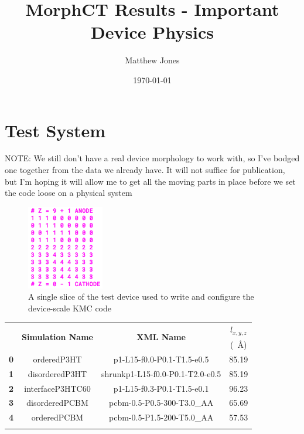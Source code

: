 \documentclass[12pt]{article}
\title{MorphCT Results - Important Device Physics}
\author{Matthew Jones}
\date{\today}
\def\ccg{\cellcolor{gray}}
\begin{document}
\maketitle


\section{Test System}

NOTE: We still don't have a real device morphology to work with, so I've bodged one together from the data we already have.
It will not suffice for publication, but I'm hoping it will allow me to get all the moving parts in place before we set the code loose on a physical system

\begin{figure}[h!]\centering
	\includegraphics[width=0.3\textwidth]{Figures/device.png}
    \caption{A single slice of the test device used to write and configure the device-scale KMC code}
	\label{fig:device}
\end{figure}

\begin{center}
\begin{tabular}{| c | c | c | c |}
\hline
\rule{0pt}{2.5ex} 
\multirow{2}{*}{\textbf{ID}}&\multirow{2}{*}{\textbf{Simulation Name}}&\multirow{2}{*}{\textbf{XML Name}}&\textbf{$l_{x,y,z}$}\\
                            &&&(\SI{}{\AA})\\
\hhline{|====|}
\rule{0pt}{2.5ex}\textbf{\ccg0}&\ccg orderedP3HT&\ccg p1-L15-f0.0-P0.1-T1.5-e0.5&\ccg 85.19\\
\textbf{1}&disorderedP3HT&shrunkp1-L15-f0.0-P0.1-T2.0-e0.5&85.19\\
\textbf{\ccg2}&\ccg interfaceP3HTC60&\ccg p1-L15-f0.3-P0.1-T1.5-e0.1&\ccg 96.23\\
\textbf{3}&disorderedPCBM&pcbm-0.5-P0.5-300-T3.0\_AA&65.69\\
\textbf{\ccg4}&\ccg orderedPCBM&\ccg pcbm-0.5-P1.5-200-T5.0\_AA&\ccg 57.53\\
\hhline{----}
\end{tabular}\label{table:cells}
\end{center}
\end{document}
